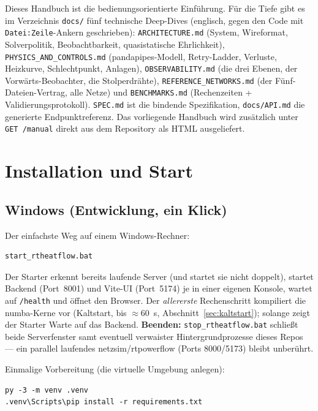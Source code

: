 \documentclass[11pt,a4paper,parskip=half]{scrreprt}
\newcommand{\api}[1]{\texttt{#1}}
\begin{document}
Dieses Handbuch ist die bedienungsorientierte Einführung. Für die Tiefe gibt es
im Verzeichnis \api{docs/} fünf technische Deep-Dives (englisch, gegen den Code
mit \texttt{Datei:Zeile}-Ankern geschrieben):
\api{ARCHITECTURE.md} (System, Wireformat, Solverpolitik, Beobachtbarkeit,
quasistatische Ehrlichkeit), \api{PHYSICS\_AND\_CONTROLS.md} (pandapipes-Modell,
Retry-Ladder, Verluste, Heizkurve, Schlechtpunkt, Anlagen),
\api{OBSERVABILITY.md} (die drei Ebenen, der Vorwärts-Beobachter, die
Stolperdrähte), \api{REFERENCE\_NETWORKS.md} (der Fünf-Dateien-Vertrag, alle
Netze) und \api{BENCHMARKS.md} (Rechenzeiten + Validierungsprotokoll).
\api{SPEC.md} ist die bindende Spezifikation, \api{docs/API.md} die generierte
Endpunktreferenz. Das vorliegende Handbuch wird zusätzlich unter \api{GET /manual}
direkt aus dem Repository als HTML ausgeliefert.

\chapter{Installation und Start}
\label{ch:installation}

\section{Windows (Entwicklung, ein Klick)}

Der einfachste Weg auf einem Windows-Rechner:

\begin{lstlisting}
start_rtheatflow.bat
\end{lstlisting}

Der Starter erkennt bereits laufende Server (und startet sie nicht doppelt),
startet Backend (Port~8001) und Vite-UI (Port~5174) je in einer eigenen Konsole,
wartet auf \api{/health} und öffnet den Browser. Der \emph{allererste}
Rechenschritt kompiliert die numba-Kerne vor (Kaltstart, bis $\approx$60~s,
Abschnitt~\ref{sec:kaltstart}); solange zeigt der Starter \glqq Warte auf das
Backend\grqq. \textbf{Beenden:} \texttt{stop\_rtheatflow.bat} schließt beide
Serverfenster samt eventuell verwaister Hintergrundprozesse dieses Repos ---
ein parallel laufendes netzsim/rtpowerflow (Ports 8000/5173) bleibt unberührt.

Einmalige Vorbereitung (die virtuelle Umgebung anlegen):

\begin{lstlisting}
py -3 -m venv .venv
.venv\Scripts\pip install -r requirements.txt
\end{lstlisting}
\end{document}
